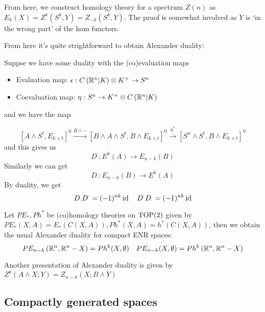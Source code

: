 From here, we construct homology theory for a spectrum $Z(n)$ as $E_k(X)=Z^k\left(S^k,Y\right)=Z_{-k}\left(S^k,Y\right)$. The proof is somewhat involved as $Y$ is `in the wrong part' of the hom functors.

From here it's quite strightforward to obtain Alexander duality:

Suppse we have some duality with the (co)evaluation maps
\begin{itemize}
    \item Evaluation map: $\epsilon:C\left(\mathbb R^n|K\right)\otimes K^+\to S^n$
    \item Coevaluation map: $\eta:S^n\to K^+\otimes C\left(\mathbb R^n|K\right)$
\end{itemize}

and we have the map

\[\left[A\wedge S^t,E_{k+t}\right]^0\overset{B\wedge-}\to\left[B\wedge A\wedge S^t,B\wedge E_{k+t}\right]^0\overset{\eta^*}\to\left[S^n\wedge S^t,B\wedge E_{k+t}\right]^0\]
and this gives us
\[D^\cdot:E^k(A)\to E_{n-k}(B)\]
Similarly we can get
\[D_\cdot:E_{n-k}(B)\to E^k(A)\]
By duality, we get
\[D_\cdot D^\cdot=(-1)^{nk}\operatorname{id}\quad D^\cdot D_\cdot=(-1)^{nk}\operatorname{id}\]

Let $PE_*,Ph^*$ be (co)homology theories on $\operatorname{TOP}(2)$ given by $PE_*(X,A)=E_*\left(C(X,A)\right),Ph^*(X,A)=h^*\left(C(X,A)\right)$, then we obtain the usual Alexander duality for compact ENR spaces:
\[PE_{n-k}\left(\mathbb R^n,\mathbb R^n-X\right)=Ph^k(X,\emptyset)\quad PE_{n-k}(X,\emptyset)=Ph^k\left(\mathbb R^n,\mathbb R^n-X\right)\]

Another presentation of Alexander duality is given by $Z^k(A\wedge X;Y)=Z_{n-k}(X;B\wedge Y)$

\subsection{Compactly generated spaces}



